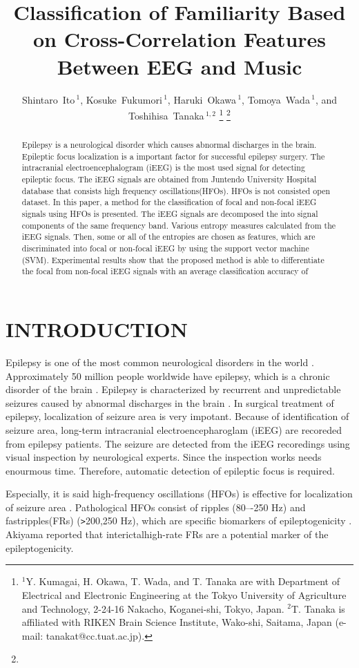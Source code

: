 \documentclass[letterpaper, 10 pt, conference]{ieeeconf}  %
\title{\LARGE \bf Classification of Familiarity Based on Cross-Correlation Features Between EEG and Music}
\author{Shintaro~Ito\,$^{1}$, Kosuke~Fukumori\,$^{1}$, Haruki~Okawa\,$^{1}$, Tomoya~Wada\,$^{1}$, and Toshihisa~Tanaka\,$^{1,2}$%
\thanks{$^{1}$Y. Kumagai, H. Okawa, T. Wada, and T. Tanaka are with Department of Electrical and Electronic Engineering at the Tokyo University of Agriculture and Technology, 2-24-16 Nakacho, Koganei-shi, Tokyo, Japan. 
$^{2}$T. Tanaka is affiliated with RIKEN Brain Science Institute, Wako-shi, Saitama, Japan (e-mail: tanakat@cc.tuat.ac.jp).
}
\thanks{
}}
\begin{document}
\maketitle
\thispagestyle{empty}
\pagestyle{empty}

\begin{abstract}
Epilepsy is a neurological disorder which causes abnormal discharges in the brain.
Epileptic focus localization is a important factor for successful epilepsy surgery.
The intracranial electroencephalogram (iEEG) is the most used signal for detecting epileptic focus.
The iEEG signals are obtained from Juntendo University Hospital database that consists high frequency oscillations(HFOs).
HFOs is not consisted open dataset. 
In this paper, a method for the classification of focal and non-focal iEEG signals using HFOs is presented.
The iEEG signals are decomposed the into signal components of the same frequency band.
Various entropy measures calculated from  the iEEG signals.
Then, some or all of the entropies are chosen as features, which are discriminated into focal or non-focal iEEG by using the support vector machine (SVM).
Experimental results show that the proposed method is able to differentiate the focal from non-focal iEEG signals with an average classification accuracy of 
\end{abstract}


\section{INTRODUCTION}
Epilepsy is one of the most common neurological disorders in the world \cite{WHO}.
Approximately 50 million people worldwide have epilepsy, which is a chronic disorder of the brain \cite{WHO}.
Epilepsy is characterized by recurrent and unpredictable seizures caused by abnormal discharges in the brain \cite{WHO}.
In surgical treatment of epilepsy, localization of seizure area is very impotant.
Because of identification of seizure area, long-term intracranial electroencepharoglam (iEEG) are recoreded from epilepsy patients.
The seizure are detected from the iEEG recoredings using visual inspection by neurological experts.
Since the inspection works needs enourmous time.
Therefore, automatic detection of epileptic focus is required.

Especially, it is said high-frequency oscillations (HFOs) is effective for localization of seizure area \cite{bragin2002local,matsumoto2013pathological,zijlmans2012high}.
Pathological HFOs consist of ripples (80–-250 Hz) and fastripples(FRs) (\verb|>|200,250 Hz), which are specific biomarkers of epileptogenicity \cite{iimura2017epileptogenic}.
Akiyama reported that interictalhigh-rate FRs are a potential marker of the epileptogenicity\cite{EPI:EPI3199}.
\end{document}

